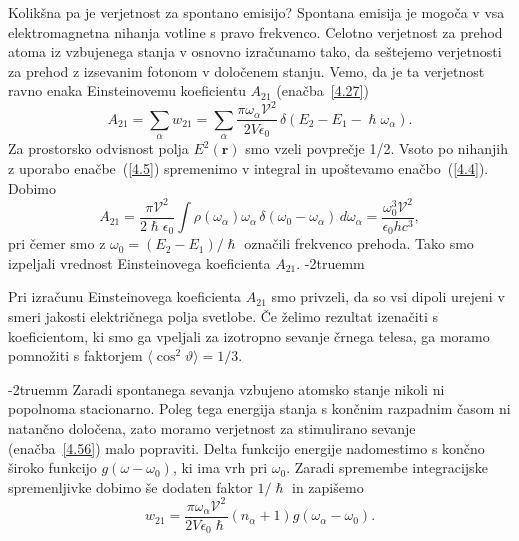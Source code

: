 Kolikšna pa je verjetnost za spontano emisijo?
Spontana emisija je mogoča v vsa elektromagnetna nihanja votline s
pravo frekvenco. Celotno verjetnost za prehod atoma iz vzbujenega stanja
v osnovno izračunamo tako, da seštejemo verjetnosti za prehod z izsevanim fotonom 
v določenem stanju. Vemo, da je ta verjetnost ravno enaka 
Einsteinovemu koeficientu $A_{21}$ (enačba~\ref{4.27})
\begin{equation}
A_{21}=\sum_{\alpha}w_{21}=\sum_{\alpha}\frac{\pi \omega_{\alpha}\mathcal{V}^{2}}
{2V\epsilon_{0}}\,\delta(E_{2}-E_{1}-\hslash\omega_{\alpha}).
\label{4.57}
\end{equation}
Za prostorsko odvisnost polja $E^{2}(\mathbf{r})$ smo vzeli povprečje
1/2. Vsoto po nihanjih z uporabo enačbe~(\ref{4.5}) spremenimo v integral
in upoštevamo enačbo~(\ref{4.4}). Dobimo
\begin{equation}
A_{21}=\frac{\pi \mathcal{V}^{2}}{2\hslash\epsilon_{0}}\int\rho(\omega_{\alpha})\omega_\alpha\, 
\delta(\omega_{0}-\omega_{\alpha})\, d\omega_{\alpha}=\frac{\omega_{0}^{3}\mathcal{V}^{2}}{\epsilon_{0} h c^{3}},
\label{4.58}
\end{equation}
 pri čemer smo z $\omega_{0}=(E_{2}-E_{1})/\hslash$ označili frekvenco prehoda. Tako smo 
 izpeljali vrednost Einsteinovega koeficienta $A_{21}$. 
 \vglue-2truemm
\begin{remark}
Pri izračunu Einsteinovega koeficienta $A_{21}$ smo privzeli, da so vsi dipoli urejeni  
 v smeri jakosti električnega polja svetlobe. Če želimo rezultat izenačiti s koeficientom, ki smo ga vpeljali
 za izotropno sevanje črnega telesa, ga moramo pomnožiti s faktorjem $\langle \cos^2\vartheta
 \rangle = 1/3$.
\end{remark}
\vglue-2truemm
Zaradi spontanega sevanja vzbujeno atomsko stanje nikoli ni popolnoma
stacionarno. Poleg tega energija stanja s končnim razpadnim časom ni natančno
določena, zato moramo verjetnost za stimulirano sevanje (enačba~\ref{4.56}) malo 
popraviti. Delta funkcijo energije nadomestimo s končno široko  
funkcijo $g(\omega-\omega_0)$, ki ima vrh pri $\omega_{0}$. Zaradi 
spremembe integracijske spremenljivke dobimo še dodaten faktor $1/\hslash$ in zapišemo
\begin{equation}
w_{21}=\frac{\pi \omega_{\alpha}\mathcal{V}^{2}}{2V\epsilon_{0}\hslash}
(n_{\alpha}+1)g(\omega_{\alpha}-\omega_0).
\label{4.59}
\end{equation}

